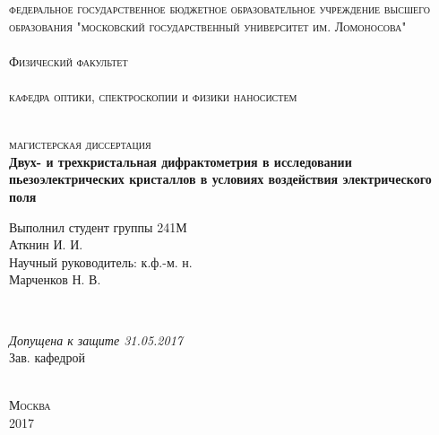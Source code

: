 \begin{titlepage}
  \begin{center}
    \textsc{\small \large федеральное государственное бюджетное образовательное
    учреждение высшего образования "московский государственный университет им. Ломоносова"}\\
    \textsc{\large \\Физический факультет}\\
    \textsc{\large \\кафедра оптики, спектроскопии и физики наносистем}\\[0.5cm]

    \begin{minipage}{\textwidth}
      \begin{flushleft}

      \end{flushleft}
    \end{minipage}\\[0.5cm]

    \textsc{\large  магистерская диссертация}\\[0.5cm]
    \textbf{\large Двух- и трехкристальная дифрактометрия в исследовании
    пьезоэлектрических кристаллов в условиях воздействия электрического поля}\\[2cm]


    \begin{minipage}{\textwidth}
      \begin{flushright}
        Выполнил студент группы 241М \\
        Аткнин И. И.\underline{\hspace*{4.6cm}}\\[0.5cm]
        Научный руководитель: к.ф.-м. н.\\
        Марченков Н. В. \underline{\hspace*{3.7cm}}

      \end{flushright}
    \end{minipage}\\[1.5cm]

    \begin{minipage}{\textwidth}
      \begin{flushleft}
        \textit{Допущена к защите 31.05.2017}\\
        Зав. кафедрой \underline{\hspace*{4.5cm}}\\
      \end{flushleft}
    \end{minipage}\\[1.5cm]

    \vfill
    \textsc{\small Москва\\ 2017}
  \end{center}
\end{titlepage}
